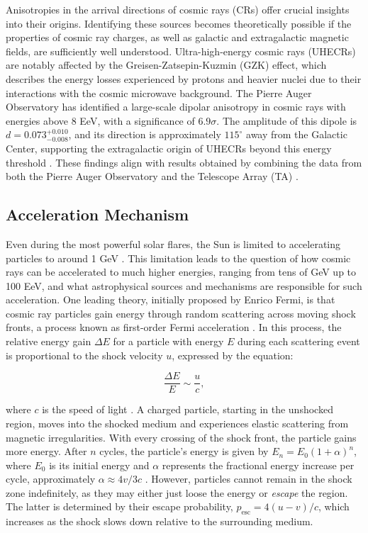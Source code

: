 Anisotropies in the arrival directions of cosmic rays (CRs) offer crucial insights into their origins. Identifying these sources becomes theoretically possible if the properties of cosmic ray charges, as well as galactic and extragalactic magnetic fields, are sufficiently well understood. Ultra-high-energy cosmic rays (UHECRs) are notably affected by the Greisen-Zatsepin-Kuzmin (GZK) effect, which describes the energy losses experienced by protons and heavier nuclei due to their interactions with the cosmic microwave background. The Pierre Auger Observatory has identified a large-scale dipolar anisotropy in cosmic rays with energies above 8 EeV, with a significance of $6.9\sigma$. The amplitude of this dipole is $d = 0.073^{+0.010}_{-0.008}$, and its direction is approximately $115^\circ$ away from the Galactic Center, supporting the extragalactic origin of UHECRs beyond this energy threshold . These findings align with results obtained by combining the data from both the Pierre Auger Observatory and the Telescope Array (TA) .

\subsection{Acceleration Mechanism}
\label{sec:accln}
Even during the most powerful solar flares, the Sun is limited to accelerating particles to around 1 GeV . This limitation leads to the question of how cosmic rays can be accelerated to much higher energies, ranging from tens of GeV up to 100 EeV, and what astrophysical sources and mechanisms are responsible for such acceleration. One leading theory, initially proposed by Enrico Fermi, is that cosmic ray particles gain energy through random scattering across moving shock fronts, a process known as first-order Fermi acceleration . In this process, the relative energy gain $\Delta E$ for a particle with energy $E$ during each scattering event is proportional to the shock velocity $u$, expressed by the equation:

\begin{equation}
    \frac{\Delta E}{E} \sim \frac{u}{c},
\end{equation}

where $c$ is the speed of light .  A charged particle, starting in the unshocked region, moves into the shocked medium and experiences elastic scattering from magnetic irregularities. With every crossing of the shock front, the particle gains more energy. After $n$ cycles, the particle's energy is given by $E_n = E_0(1 + \alpha)^n$, where $E_0$ is its initial energy and $\alpha$ represents the fractional energy increase per cycle, approximately $\alpha \approx 4v/3c$ . However, particles cannot remain in the shock zone indefinitely, as they may either just loose the energy or \emph{escape} the region. The latter is determined by their escape probability, $p_{\text{esc}} = 4(u - v)/c$, which increases as the shock slows down relative to the surrounding medium.

